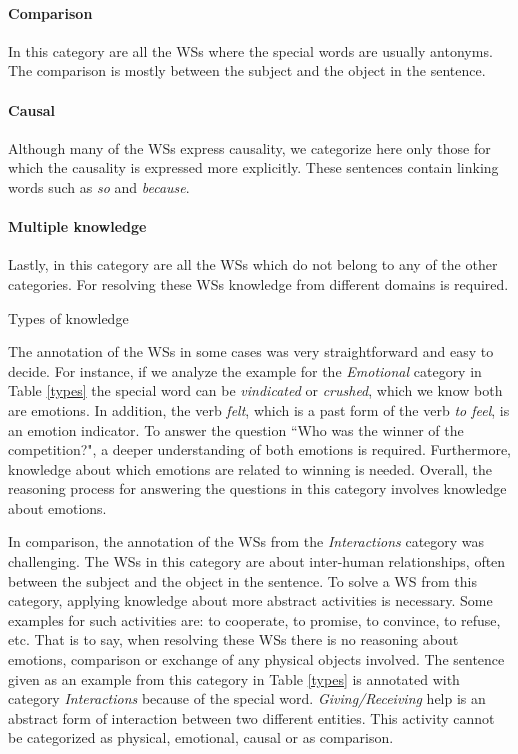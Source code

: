 \paragraph{Comparison} In this category are all the WSs where the special words are usually antonyms. The comparison is mostly between the subject and the object in the sentence. 

\paragraph{Causal} Although many of the WSs express causality, we categorize here only those for which the causality is expressed more explicitly. These sentences contain linking words such as \textit{so} and \textit{because}.

\paragraph{Multiple knowledge} Lastly, in this category are all the WSs which do not belong to any of the other categories. For resolving these WSs knowledge from different domains is required.

\begin{table} [h!]
	 
	\caption{{\label{types}}Types of knowledge}
\end{table}

The annotation of the WSs in some cases was very straightforward and easy to decide. For instance, if we analyze the example for the \textit{Emotional} category in Table \ref{types} the special word can be \textit{vindicated} or \textit{crushed}, which we know both are emotions. In addition, the verb \textit{felt}, which is a past form of the verb \textit{to feel}, is an emotion indicator. To answer the question ``Who was the winner of the competition?", a deeper understanding of both emotions is required. Furthermore, knowledge about which emotions are related to winning is needed. 
Overall, the reasoning process for answering the questions in this category involves knowledge about emotions. 

In comparison, the annotation of the WSs from the \textit{Interactions} category was challenging. The WSs in this category are about inter-human relationships, often between the subject and the object in the sentence. 
To solve a WS from this category, applying knowledge about more abstract activities is necessary. Some examples for such activities are: to cooperate, to promise, to convince, to refuse, etc. That is to say, when resolving these WSs there is no reasoning about emotions, comparison or exchange of any physical objects involved.  
The sentence given as an example from this category in Table \ref{types} is annotated with category \textit{Interactions} because of the special word. \textit{Giving/Receiving} help is an abstract form of interaction between two different entities. This activity cannot be categorized as physical, emotional, causal or as comparison.

